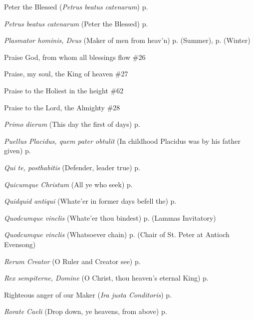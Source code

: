 \begin{hangparas}{1.25em}{1}
\par\noindent
Peter the Blessed (\textit{Petrus beatus catenarum}) \dotfill p. \pageref{LammasEvensong}
\par\noindent
\textit{Petrus beatus catenarum} (Peter the Blessed) \dotfill p. \pageref{LammasEvensong}
\par\noindent
\textit{Plasmator hominis, Deus} (Maker of men from heav'n) \dotfill p. \pageref{FridayEvensongSummer} (Summer), p. \pageref{FridayEvensongWinter} (Winter)
\par\noindent
Praise God, from whom all blessings flow \dotfill \#26
\par\noindent
Praise, my soul, the King of heaven \dotfill \#27
\par\noindent
Praise to the Holiest in the height \dotfill \#62
\par\noindent
Praise to the Lord, the Almighty \dotfill \#28
\par\noindent
\textit{Primo dierum} (This day the first of days) \dotfill p. \pageref{SundayInvitatoryWinter}
\par\noindent
\textit{Puellus Placidus, quem pater obtulit} (In childhood Placidus was by his father given) \dotfill p. \pageref{MaurusInvitatory}
\par\noindent
\textit{Qui te, posthabitis} (Defender, leader true) \dotfill p. \pageref{MaurusEvensong}
\par\noindent
\textit{Quicumque Christum} (All ye who seek) \dotfill p. \pageref{TransfigurationEvensong}
\par\noindent
\textit{Quidquid antiqui} (Whate'er in former days befell the) \dotfill p. \pageref{BenedictInvitatory}
\par\noindent
\textit{Quodcumque vinclis} (Whate'er thou bindest) \dotfill p. \pageref{LammasInvitatory} (Lammas Invitatory)
\par\noindent
\textit{Quodcumque vinclis} (Whatsoever chain) \dotfill p. \pageref{PeterAntiochEvensong} (Chair of St. Peter at Antioch Evensong)
\par\noindent
\textit{Rerum Creator} (O Ruler and Creator see) \dotfill p. \pageref{WednesdayInvitatory}
\par\noindent
\textit{Rex sempiterne, Domine} (O Christ, thou heaven's eternal King) \dotfill p. \pageref{EasterInvitatory}
\par\noindent
Righteous anger of our Maker (\textit{Ira justa Conditoris}) \dotfill p. \pageref{PreciousBloodInvitatory}
\par\noindent
\textit{Rorate Caeli} (Drop down, ye heavens, from above) \dotfill p. \pageref{AdventProse}

\end{hangparas}
